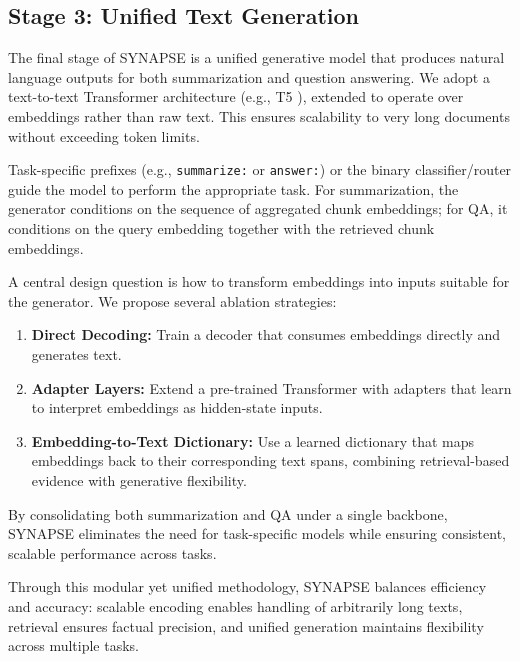 \documentclass[11pt]{article}
\begin{document}
\subsection{Stage 3: Unified Text Generation}
The final stage of SYNAPSE is a unified generative model that produces natural language outputs for both summarization and question answering. We adopt a text-to-text Transformer architecture (e.g., T5 \citep{raffel2023exploringlimitstransferlearning}), extended to operate over embeddings rather than raw text. This ensures scalability to very long documents without exceeding token limits.

Task-specific prefixes  (e.g., \texttt{summarize:} or \texttt{answer:}) or the binary classifier/router guide the model to perform the appropriate task. For summarization, the generator conditions on the sequence of aggregated chunk embeddings; for QA, it conditions on the query embedding together with the retrieved chunk embeddings.

A central design question is how to transform embeddings into inputs suitable for the generator. We propose several ablation strategies:
\begin{enumerate}
    \item \textbf{Direct Decoding:} Train a decoder that consumes embeddings directly and generates text.
    \item \textbf{Adapter Layers:} Extend a pre-trained Transformer with adapters that learn to interpret embeddings as hidden-state inputs.
    \item \textbf{Embedding-to-Text Dictionary:} Use a learned dictionary that maps embeddings back to their corresponding text spans, combining retrieval-based evidence with generative flexibility.
\end{enumerate}

By consolidating both summarization and QA under a single backbone, SYNAPSE eliminates the need for task-specific models while ensuring consistent, scalable performance across tasks.

Through this modular yet unified methodology, SYNAPSE balances efficiency and accuracy: scalable encoding enables handling of arbitrarily long texts, retrieval ensures factual precision, and unified generation maintains flexibility across multiple tasks.
\end{document}
